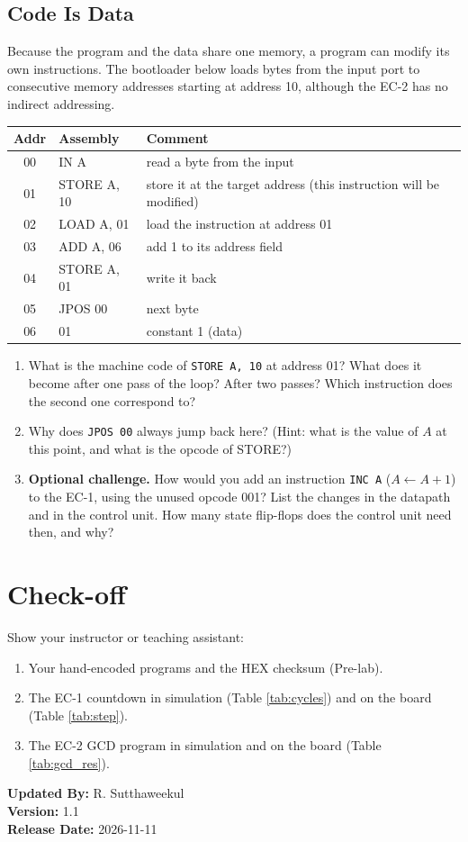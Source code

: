 \documentclass{article}
\begin{document}
\subsection*{Code Is Data}

Because the program and the data share one memory, a program can modify its own instructions. The bootloader below loads bytes from the input port to consecutive memory addresses starting at address 10, although the EC-2 has no indirect addressing.

\begin{center}
\begin{tabular}{|c|l|l|}
    \hline
    \textbf{Addr} & \textbf{Assembly} & \textbf{Comment} \\
    \hline
    00 & IN A & read a byte from the input \\ \hline
    01 & STORE A, 10 & store it at the target address (this instruction will be modified) \\ \hline
    02 & LOAD A, 01 & load the instruction at address 01 \\ \hline
    03 & ADD A, 06 & add 1 to its address field \\ \hline
    04 & STORE A, 01 & write it back \\ \hline
    05 & JPOS 00 & next byte \\ \hline
    06 & 01 & constant 1 (data) \\ \hline
\end{tabular}
\end{center}

\begin{enumerate}
    \item What is the machine code of \texttt{STORE A, 10} at address 01? What does it become after one pass of the loop? After two passes? Which instruction does the second one correspond to? \underline{\hspace{6cm}}
    \item Why does \texttt{JPOS 00} always jump back here? (Hint: what is the value of $A$ at this point, and what is the opcode of STORE?)
    \item \textbf{Optional challenge.} How would you add an instruction \texttt{INC A} ($A \leftarrow A+1$) to the EC-1, using the unused opcode 001? List the changes in the datapath and in the control unit. How many state flip-flops does the control unit need then, and why?
\end{enumerate}

\section*{Check-off}
Show your instructor or teaching assistant:
\begin{enumerate}
    \item Your hand-encoded programs and the HEX checksum (Pre-lab).
    \item The EC-1 countdown in simulation (Table \ref{tab:cycles}) and on the board (Table \ref{tab:step}).
    \item The EC-2 GCD program in simulation and on the board (Table \ref{tab:gcd_res}).
\end{enumerate}

\vspace{1cm}
\noindent \textbf{Updated By:} R. Sutthaweekul \\
\textbf{Version:} 1.1 \\
\textbf{Release Date:} 2026-11-11
\end{document}
